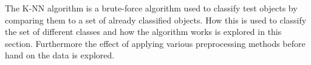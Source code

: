 The K-NN algorithm is a brute-force algorithm used to classify test objects by comparing them to a set of already classified objects.
How this is used to classify the set of different classes and how the algorithm works is explored in this section.
Furthermore the effect of applying various preprocessing methods before hand on the data is explored.